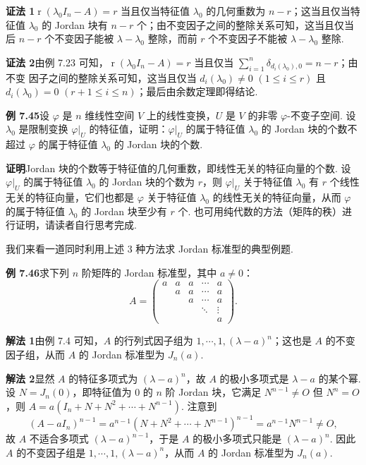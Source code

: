 \documentclass[UTF8,12pt,a4paper,fontset=fandol]{ctexart}
\begin{document}
\noindent\textbf{证法 1}\quad $\operatorname{r}(\lambda_0I_n-A)=r$ 当且仅当特征值 $\lambda_0$ 的几何重数为 $n-r$；这当且仅当特征值 $\lambda_0$ 的 Jordan 块有 $n-r$ 个；由不变因子之间的整除关系可知，这当且仅当后 $n-r$ 个不变因子能被 $\lambda-\lambda_0$ 整除，而前 $r$ 个不变因子不能被 $\lambda-\lambda_0$ 整除.

\noindent\textbf{证法 2}\quad 由例 7.23 可知，$\operatorname{r}(\lambda_0I_n-A)=r$ 当且仅当 $\sum_{i=1}^n\delta_{d_i(\lambda_0),0}=n-r$；由不变
因子之间的整除关系可知，这当且仅当 $d_i(\lambda_0)\ne 0$ $(1\le i\le r)$ 且 $d_i(\lambda_0)=0$ $(r+1\le i\le n)$；最后由余数定理即得结论.

\noindent\textbf{例 7.45}\quad 设 $\varphi$ 是 $n$ 维线性空间 $V$ 上的线性变换，$U$ 是 $V$ 的非零 $\varphi$-不变子空间. 设 $\lambda_0$ 是限制变换 $\varphi|_U$ 的特征值，证明：$\varphi|_U$ 的属于特征值 $\lambda_0$ 的 Jordan 块的个数不超过 $\varphi$ 的属于特征值 $\lambda_0$ 的 Jordan 块的个数.

\noindent\textbf{证明}\quad Jordan 块的个数等于特征值的几何重数，即线性无关的特征向量的个数. 设 $\varphi|_U$ 的属于特征值 $\lambda_0$ 的 Jordan 块的个数为 $r$，则 $\varphi|_U$ 关于特征值 $\lambda_0$ 有 $r$ 个线性无关的特征向量，它们也都是 $\varphi$ 关于特征值 $\lambda_0$ 的线性无关的特征向量，从而 $\varphi$ 的属于特征值 $\lambda_0$ 的 Jordan 块至少有 $r$ 个. 也可用纯代数的方法（矩阵的秩）进行证明，请读者自行思考完成.

我们来看一道同时利用上述 3 种方法求 Jordan 标准型的典型例题.

\noindent\textbf{例 7.46}\quad 求下列 $n$ 阶矩阵的 Jordan 标准型，其中 $a\ne 0$：
\[
A=\left(\begin{array}{ccccc}
a & a & a & \cdots & a\\
  & a & a & \cdots & a\\
  &   & a & \cdots & a\\
  &   &   & \ddots & \vdots\\
  &   &   &        & a
\end{array}\right).
\]

\noindent\textbf{解法 1}\quad 由例 7.4 可知，$A$ 的行列式因子组为 $1,\cdots,1,(\lambda-a)^n$；这也是 $A$ 的不变因子组，从而 $A$ 的 Jordan 标准型为 $J_n(a)$.

\noindent\textbf{解法 2}\quad 显然 $A$ 的特征多项式为 $(\lambda-a)^n$，故 $A$ 的极小多项式是 $\lambda-a$ 的某个幂. 设 $N=J_n(0)$，即特征值为 $0$ 的 $n$ 阶 Jordan 块，它满足 $N^{n-1}\ne O$ 但 $N^n=O$，则 $A=a(I_n+N+N^2+\cdots+N^{n-1})$. 注意到
\[
(A-aI_n)^{n-1}=a^{n-1}(N+N^2+\cdots+N^{n-1})^{n-1}=a^{n-1}N^{n-1}\ne O,
\]
故 $A$ 不适合多项式 $(\lambda-a)^{n-1}$，于是 $A$ 的极小多项式只能是 $(\lambda-a)^n$. 因此 $A$ 的不变因子组是 $1,\cdots,1,(\lambda-a)^n$，从而 $A$ 的 Jordan 标准型为 $J_n(a)$.
\end{document}
